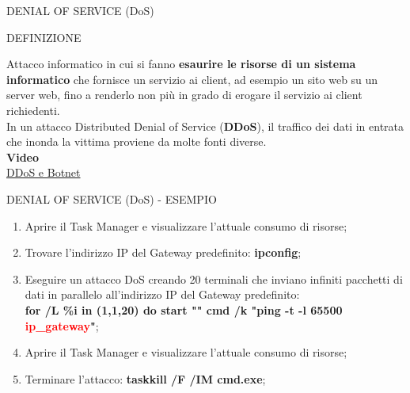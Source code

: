 \documentclass[aspectratio=1610]{beamer}
\begin{document}
\begin{frame}{DENIAL OF SERVICE (DoS)}
    \begin{alertblock}{DEFINIZIONE}
        \begin{minipage}{0.98\linewidth}
            \justifying
            Attacco informatico in cui si fanno \textbf{esaurire le risorse di un sistema informatico} 
            che fornisce un servizio ai client, ad esempio un sito web su un server web, 
            fino a renderlo non più in grado di erogare il servizio ai client richiedenti.\\
            In un attacco Distributed Denial of Service (\textbf{DDoS}), il traffico dei dati in entrata 
            che inonda la vittima proviene da molte fonti diverse.\\
            \bigskip
            \tiny{\textbf{Video}}\\
            \tiny{\href{https://www.youtube.com/watch?v=ilhGh9CEIwM}{DDoS e Botnet}}
        \end{minipage}
    \end{alertblock}
\end{frame}

\begin{frame}{DENIAL OF SERVICE (DoS) - ESEMPIO}
    \begin{enumerate}
        \item Aprire il Task Manager e visualizzare l’attuale consumo di risorse;
        \pause
        \item Trovare l'indirizzo IP del Gateway predefinito: \textbf{ipconfig};
        \pause
        \item Eseguire un attacco DoS creando 20 terminali che inviano infiniti pacchetti di dati in parallelo 
        all'indirizzo IP del Gateway predefinito:\\ 
        \textbf{for /L \%i in (1,1,20) do start "" cmd /k "ping -t -l 65500 \textcolor{red}{ip\_gateway}"};
        \pause
        \item Aprire il Task Manager e visualizzare l’attuale consumo di risorse;
        \pause
        \item Terminare l'attacco: \textbf{taskkill /F /IM cmd.exe};
    \end{enumerate}                        
\end{frame}
\end{document}
